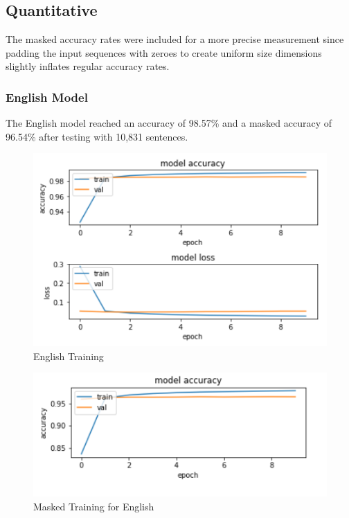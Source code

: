 \documentclass[conference]{IEEEtran}
\begin{document}
\subsection{Quantitative}
The masked accuracy rates were included for a more precise measurement since padding the input sequences with zeroes to create uniform size dimensions slightly inflates regular accuracy rates.

\subsubsection{English Model}
The English model reached an accuracy of 98.57\% and a masked accuracy of 96.54\% after testing with 10,831 sentences.

\begin{figure}[htbp]
\centerline{\includegraphics[width=\linewidth]{englishTraining.PNG}}
\caption{English Training}
\label{fig5}
\end{figure}

\begin{figure}[htbp]
\centerline{\includegraphics[width=\linewidth]{englishmasked.PNG}}
\caption{Masked Training for English}
\label{fig6}
\end{figure}
\end{document}
